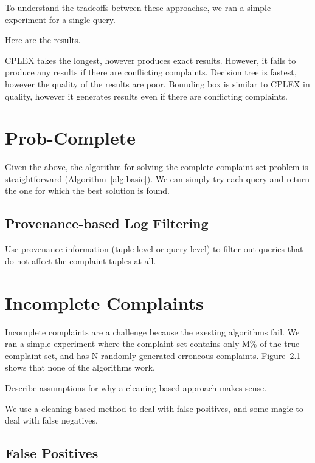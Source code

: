To understand the tradeoffs between these approachse, we ran a simple experiment for a single query.

Here are the results.


CPLEX takes the longest, however produces exact results.  However, it fails to produce any results if there are conflicting complaints.
Decision tree is fastest, however the quality of the results are poor.
Bounding box is similar to CPLEX in quality, however it generates results even if there are conflicting complaints.








\section{Prob-Complete}

Given the above, the algorithm for solving the complete complaint set problem is straightforward (Algorithm~\ref{alg:basic}).
We can simply try each query and return the one for which the best solution is found.

\subsection{Provenance-based Log Filtering}

Use provenance information (tuple-level or query level) to filter out queries that do not 
affect the complaint tuples at all.





\section{Incomplete Complaints}
\label{s:incomplete-algs}

Incomplete complaints are a challenge because the exesting algorithms fail.  We ran a simple experiment
where the complaint set contains only M\% of the true complaint set, and has N randomly generated erroneous complaints.
Figure~\ref{} shows that none of the algorithms work.

Describe assumptions for why a cleaning-based approach makes sense.

We use a cleaning-based method to deal with false positives, and some magic to deal with false negatives.

\subsection{False Positives}

